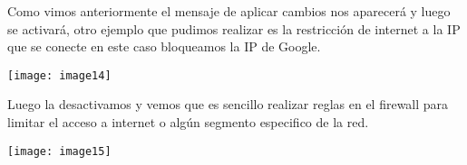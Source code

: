 \noindent Como vimos anteriormente el mensaje de aplicar cambios nos aparecer\'{a} y luego se activar\'{a}, otro ejemplo que pudimos realizar es la restricci\'{o}n de internet a la IP que se conecte en este caso bloqueamos la IP de Google.

\noindent  \texttt{[image: image14]}

\noindent 

\noindent Luego la desactivamos y vemos que es sencillo realizar reglas en el firewall para limitar el acceso a internet o alg\'{u}n segmento especifico de la red.

\noindent 

\noindent \texttt{[image: image15]}




